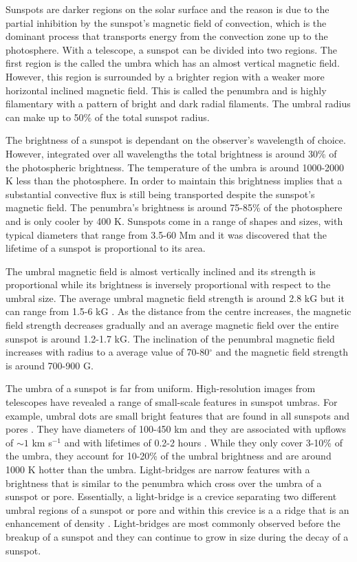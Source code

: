 	Sunspots are darker regions on the solar surface and the reason is due to the partial inhibition by the sunspot's magnetic field of convection, which is the dominant process that transports energy from the convection zone up to the photosphere.
	With a telescope, a sunspot can be divided into two regions.
	The first region is the called the umbra which has an almost vertical magnetic field.
	However, this region is  surrounded by a brighter region with a weaker more horizontal inclined magnetic field.
	This is called the penumbra and is highly filamentary with a pattern of bright and dark radial filaments.
	The umbral radius can make up to 50\% of the total sunspot radius.
	
	The brightness of a sunspot is dependant on the observer's wavelength of choice.
	However, integrated over all wavelengths the total brightness is around 30\% of the photospheric brightness.
	The temperature of the umbra is around 1000-2000 K less than the photosphere.
	In order to maintain this brightness implies that a substantial convective flux is still being transported despite the sunspot's magnetic field.
	The penumbra's brightness is around 75-85\% of the photosphere and is only cooler by 400 K.
	Sunspots come in a range of shapes and sizes, with typical diameters that range from 3.5-60 Mm and it was discovered that the lifetime of a sunspot is proportional to its area. 
	
	The umbral magnetic field is almost vertically inclined and its strength is proportional while its brightness is inversely proportional with respect to the umbral size.
	The average umbral magnetic field strength is around 2.8 kG but it can range from 1.5-6 kG \citep{2006SoPh..239...41L}.
	As the distance from the centre increases, the magnetic field strength decreases gradually and an average magnetic field over the entire sunspot is around 1.2-1.7 kG.
	The inclination of the penumbral magnetic field increases with radius to a average value of 70-80$^\circ$ and the magnetic field strength is around 700-900 G.

	The umbra of a sunspot is far from uniform.
	High-resolution images from telescopes have revealed a range of small-scale features in sunspot umbras.
	For example, umbral dots are small bright features that are found in all sunspots and pores \citep{1950Obs....70..234T,1964ApJ...139...45D}.
	They have diameters of 100-450 km and they are associated with upflows of $\sim1$ km s$^{-1}$ and with lifetimes of 0.2-2 hours \citep{1997A&A...328..682S,1997A&A...328..689S}.
	While they only cover 3-10\% of the umbra, they account for 10-20\% of the umbral brightness and are around 1000 K hotter than the umbra.
	Light-bridges are narrow features with a brightness that is similar to the penumbra which cross over the umbra of a sunspot or pore.
	Essentially, a light-bridge is a crevice separating two different umbral regions of a sunspot or pore and within this crevice is a a ridge that is an enhancement of density \citep{2002A&A...383..275H}.
	Light-bridges are most commonly observed before the breakup of a sunspot and they can continue to grow in size during the decay of a sunspot.
	
